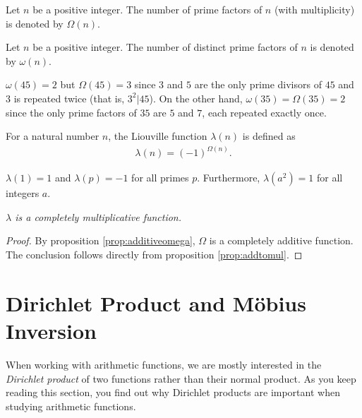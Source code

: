 \documentclass[12pt]{subfile}
\begin{document}
		\begin{definition}
			Let $n$ be a positive integer. The number of prime factors of $n$ (with multiplicity) is denoted by $\Omega(n)$.
		\end{definition}

		\begin{definition}
			Let $n$ be a positive integer. The number of distinct prime factors of $n$ is denoted by $\omega(n)$.
		\end{definition}

		\begin{example}
			$\omega(45)=2$ but $\Omega(45)=3$ since $3$ and $5$ are the only prime divisors of $45$ and $3$ is repeated twice (that is, $3^2|45$). On the other hand, $\omega(35)=\Omega(35)=2$ since the only prime factors of $35$ are $5$ and $7$, each repeated exactly once.
		\end{example}

		\begin{definition}
			For a natural number $n$, the Liouville function $\lambda (n)$ is defined as
			\begin{align*}
			\lambda (n) =  (-1)^{\Omega(n)}.
			\end{align*}
		\end{definition}

		\begin{example}
			$\lambda(1) = 1$ and $\lambda(p)=-1$ for all primes $p$. Furthermore, $\lambda (a^2) =1$ for all integers $a$.
		\end{example}

		\begin{theorem}\slshape
			$\lambda $ is a completely multiplicative function.
		\end{theorem}

		\begin{proof}
			By proposition \ref{prop:additiveomega}, $\Omega$ is a completely additive function. The conclusion follows directly from proposition \ref{prop:addtomul}.
		\end{proof}

\section{Dirichlet Product and M\" {o}bius Inversion}\label{sec:dirichletmobius}

	When working with arithmetic functions, we are mostly interested in the \textit{Dirichlet product} of two functions rather than their normal product. As you keep reading this section, you find out why Dirichlet products are important when studying arithmetic functions.
\end{document}
